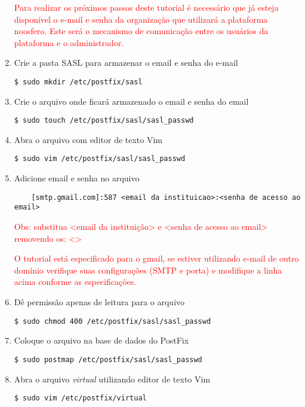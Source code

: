 \begin{enumerate}[label=\alph*)]
\textcolor{red}{{\scriptsize Para realizar os próximos passos deste tutorial é necessário que já esteja disponível o e-mail e senha da organização que utilizará a 	plataforma noosfero. Este será o mecanismo de comunicação entre os usuários da plataforma e o administrador. }}

\item Crie a pasta SASL para armazenar o email e senha do e-mail
\begin{lstlisting}
$ sudo mkdir /etc/postfix/sasl
\end{lstlisting}

\item Crie o arquivo onde ficará armazenado o email e senha do email
\begin{lstlisting}
$ sudo touch /etc/postfix/sasl/sasl_passwd
\end{lstlisting}

\item Abra o arquivo com editor de texto Vim
\begin{lstlisting}
$ sudo vim /etc/postfix/sasl/sasl_passwd
\end{lstlisting}

\item Adicione email e senha no arquivo
\begin{lstlisting}
	[smtp.gmail.com]:587 <email da instituicao>:<senha de acesso ao email>
\end{lstlisting}
\textcolor{red}{{\scriptsize Obs: substitua <email da instituição> e <senha de acesso ao email> removendo os: <> }}

\textcolor{red}{{\scriptsize O tutorial está especificado para o gmail, se estiver utilizando e-mail de outro domínio verifique suas configurações (SMTP e porta) e modifique a linha acima conforme as especificações. }}

\item Dê permissão apenas de leitura para o arquivo
\begin{lstlisting}
$ sudo chmod 400 /etc/postfix/sasl/sasl_passwd
\end{lstlisting}

\item Coloque o arquivo na base de dados do PostFix
\begin{lstlisting}
$ sudo postmap /etc/postfix/sasl/sasl_passwd
\end{lstlisting}

\item Abra o arquivo \emph{virtual} utilizando editor de texto Vim
\begin{lstlisting}
$ sudo vim /etc/postfix/virtual
\end{lstlisting}


\end{enumerate}
